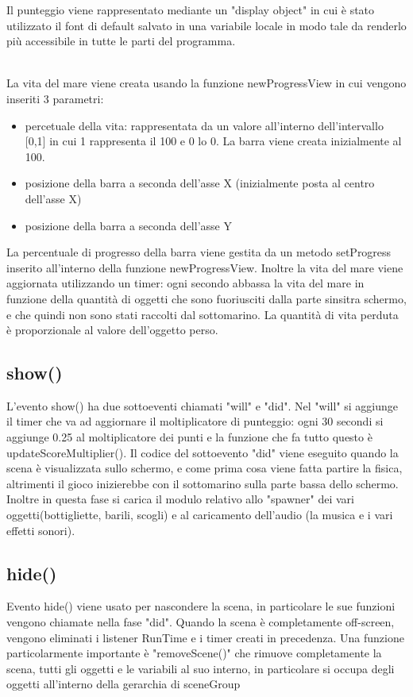 \documentclass[12pt]{article}
\begin{document}
Il punteggio viene rappresentato mediante un "display object" in cui è stato utilizzato il font di default salvato in una variabile locale in modo tale da renderlo più accessibile in tutte le parti del programma. 

\\
La vita del mare viene creata usando la funzione newProgressView in cui vengono inseriti 3 parametri:
\begin{itemize}
    \item percetuale della vita: rappresentata da un valore all'interno dell'intervallo [0,1] in cui 1 rappresenta il 100 e 0 lo 0. La barra viene creata inizialmente al 100.
    \item posizione della barra a seconda dell'asse X (inizialmente posta al centro dell'asse X)
    \item posizione della barra a seconda dell'asse Y
\end{itemize}
La percentuale di progresso della barra viene gestita da un metodo setProgress inserito all'interno della funzione newProgressView. Inoltre la vita del mare viene aggiornata utilizzando un timer: ogni secondo abbassa la vita del mare in funzione della quantità di oggetti che sono fuoriusciti dalla parte sinsitra schermo, e che quindi non sono stati raccolti dal sottomarino. La quantità di vita perduta è proporzionale al valore dell'oggetto perso.

\subsection{show()}
L'evento show() ha due sottoeventi chiamati "will" e "did". Nel "will" si aggiunge il timer che va ad aggiornare il moltiplicatore di punteggio: ogni 30 secondi si aggiunge 0.25 al moltiplicatore dei punti e la funzione che fa tutto questo è updateScoreMultiplier(). Il codice del sottoevento "did" viene eseguito quando la scena è visualizzata sullo schermo, e come prima cosa viene fatta partire la fisica, altrimenti il gioco inizierebbe con il sottomarino sulla parte bassa dello schermo. Inoltre in questa fase si carica il modulo relativo allo "spawner" dei vari oggetti(bottigliette, barili, scogli) e al caricamento dell'audio (la musica e i vari effetti sonori).

\subsection{hide()}
Evento hide() viene usato per nascondere la scena, in particolare le sue funzioni vengono chiamate nella fase "did". Quando la scena è completamente off-screen, vengono eliminati i listener RunTime e i timer creati in precedenza. Una funzione particolarmente importante è "removeScene()" che rimuove completamente la scena, tutti gli oggetti e le variabili al suo interno,
in particolare si occupa degli oggetti all'interno della gerarchia di sceneGroup 
\\
\end{document}

